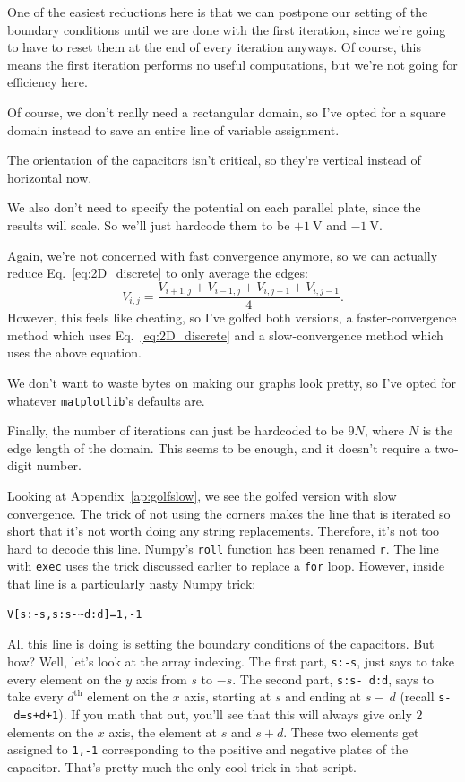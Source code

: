 \documentclass[12pt,twocolumn]{article}
\begin{document}
One of the easiest reductions here is that we can postpone our setting of the boundary conditions until we are done with the first iteration, since we're going to have to reset them at the end of every iteration anyways. Of course, this means the first iteration performs no useful computations, but we're not going for efficiency here.

Of course, we don't really need a rectangular domain, so I've opted for a square domain instead to save an entire line of variable assignment.

The orientation of the capacitors isn't critical, so they're vertical instead of horizontal now.

We also don't need to specify the potential on each parallel plate, since the results will scale. So we'll just hardcode them to be $+1~\si{\volt}$ and $-1~\si{\volt}$.

Again, we're not concerned with fast convergence anymore, so we can actually reduce Eq.~\ref{eq:2D_discrete} to only average the edges:
\begin{equation}
V_{i,j} = \frac{V_{i+1,j}+V_{i-1,j}+V_{i,j+1}+V_{i,j-1}}{4}.
\end{equation}
However, this feels like cheating, so I've golfed both versions, a faster-convergence method which uses Eq.~\ref{eq:2D_discrete} and a slow-convergence method which uses the above equation.

We don't want to waste bytes on making our graphs look pretty, so I've opted for whatever \texttt{matplotlib}'s defaults are.

Finally, the number of iterations can just be hardcoded to be $9N$, where $N$ is the edge length of the domain. This seems to be enough, and it doesn't require a two-digit number.

Looking at Appendix~\ref{ap:golfslow}, we see the golfed version with slow convergence. The trick of not using the corners makes the line that is iterated so short that it's not worth doing any string replacements. Therefore, it's not too hard to decode this line. Numpy's \texttt{roll} function has been renamed \texttt{r}. The line with \texttt{exec} uses the trick discussed earlier to replace a \texttt{for} loop. However, inside that line is a particularly nasty Numpy trick:
\begin{verbatim}
V[s:-s,s:s-~d:d]=1,-1
\end{verbatim}
All this line is doing is setting the boundary conditions of the capacitors. But how? Well, let's look at the array indexing. The first part, \texttt{s:-s}, just says to take every element on the $y$ axis from $s$ to $-s$. The second part, \texttt{s:s-~d:d}, says to take every $d^\mathrm{th}$ element on the $x$ axis, starting at $s$ and ending at $s-~d$ (recall \texttt{s-~d=s+d+1}). If you math that out, you'll see that this will always give only $2$ elements on the $x$ axis, the element at $s$ and $s+d$. These two elements get assigned to \texttt{1,-1} corresponding to the positive and negative plates of the capacitor. That's pretty much the only cool trick in that script.
\end{document}
